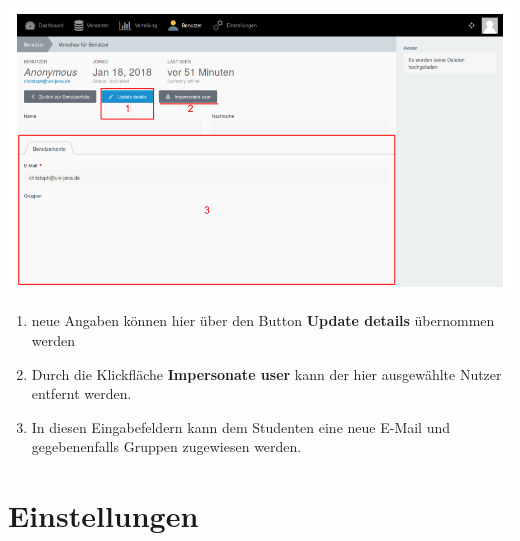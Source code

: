   
  \includegraphics[scale=0.3]{backend/img/users_3.png}
  \begin{enumerate}
   \item neue Angaben können hier über den Button \textbf{Update details} übernommen werden
   \item Durch die Klickfläche \textbf{Impersonate user} kann der hier ausgewählte Nutzer entfernt werden.
   \item In diesen Eingabefeldern kann dem Studenten eine neue E-Mail und gegebenenfalls Gruppen zugewiesen werden.
  \end{enumerate}

  
  
  \section{Einstellungen}
  \label{section:settings}
  
